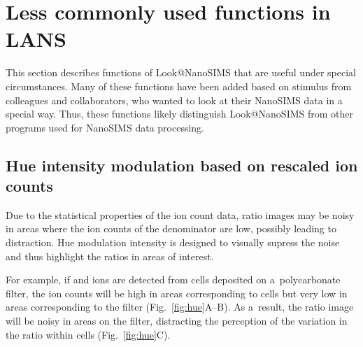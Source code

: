 \section{Less commonly used functions in LANS}
\label{sec:level3}

This section describes functions of Look@NanoSIMS that are useful under special circumstances. Many of these functions have been added based on stimulus from colleagues and collaborators, who wanted to look at their NanoSIMS data in a special way. Thus, these functions likely distinguish Look@NanoSIMS from other programs used for NanoSIMS data processing.


\subsection{Hue intensity modulation based on rescaled ion counts}
\setcounter{step}{0}

\goldbox{}
Due to the statistical properties of the ion count data, ratio images may be noisy in areas where the ion counts of the denominator are low, possibly leading to distraction. Hue modulation intensity is designed to visually supress the noise and thus highlight the ratios in areas of interest. 
\tcbe

For example, if  and  ions are detected from cells deposited on a~polycarbonate filter, the ion counts will be high in areas corresponding to cells but very low in areas corresponding to the filter (Fig.~\ref{fig:hue}A--B). As a~result, the ratio image  will be noisy in areas on the filter, distracting the perception of the variation in the  ratio within cells (Fig.~\ref{fig:hue}C). 

